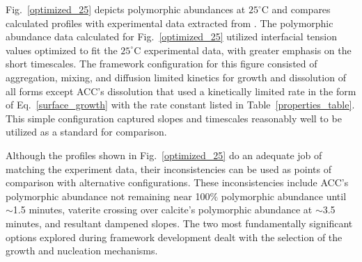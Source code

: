 \documentclass[preprint,3p,a4paper,times,12pt,authoryear]{elsarticle}
\begin{document}
Fig.~\ref{optimized_25} depicts polymorphic abundances at $25^\circ$C and compares calculated profiles with experimental data extracted from \citep{Ogino1987}.  The polymorphic abundance data calculated for Fig.~\ref{optimized_25} utilized interfacial tension values optimized to fit the $25^\circ$C experimental data, with greater emphasis on the short timescales.  The framework configuration for this figure consisted of aggregation, mixing, and diffusion limited kinetics for growth and dissolution of all  forms except ACC's dissolution that used a kinetically limited rate in the form of Eq.~\ref{surface_growth} with the rate constant listed in Table~\ref{properties_table}.  This simple configuration captured slopes and timescales reasonably well to be utilized as a standard for comparison.    

Although the profiles shown in Fig.~\ref{optimized_25} do an adequate job of matching the experiment data, their inconsistencies can be used as points of comparison with alternative configurations.  These inconsistencies include ACC's polymorphic abundance not remaining near 100$\%$ polymorphic abundance until $\sim$1.5 minutes, vaterite crossing over calcite's polymorphic abundance at $\sim$3.5 minutes, and resultant dampened slopes.  
The two most fundamentally significant options explored during framework development dealt with the selection of the growth and nucleation mechanisms.
\end{document}
